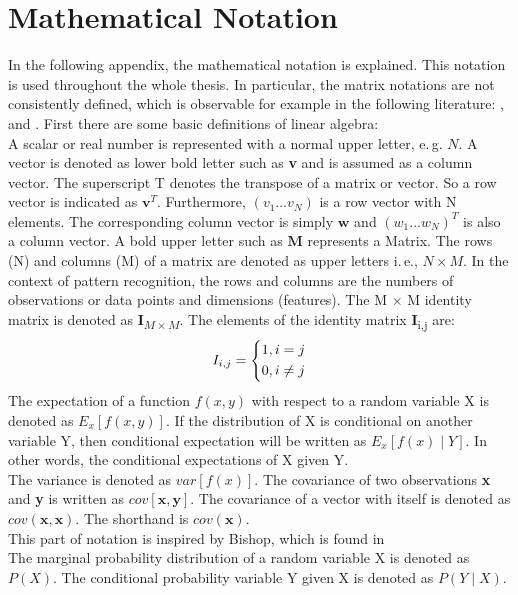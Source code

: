 \chapter{Mathematical Notation}\label{appaA}
In the following appendix, the mathematical notation is explained.
This notation is used throughout the whole thesis.
In particular, the matrix notations are not consistently defined, which is observable for example in the following literature: \cite{Chen.2009}, \cite{Bishop.2009} and \cite{Long.2015}.
First there are some basic definitions of linear algebra:\\
A scalar or real number is represented with a normal upper letter, e.\,g. $N$.
A vector is denoted as lower bold letter such as \textbf{v} and is assumed as a column vector.
The superscript T denotes the transpose of a matrix or vector. So a row vector is indicated as $\mathbf{v}^{T}$.
Furthermore, $(v_1 \dots v_N)$ is a row vector with N elements.
The corresponding column vector is simply $\mathbf{w}$ and $(w_1 \dots w_N)^T$ is also a column vector.
A bold upper letter such as $\mathbf{M}$ represents a Matrix.
The rows (N) and columns (M) of a matrix are denoted as upper letters i.\,e., $N \times M$. 
In the context of pattern recognition, the rows and columns are the numbers of observations or data points and dimensions (features). 
The M $\times$ M identity matrix is denoted as \textbf{I}\textsubscript{$M\times M$}.
The elements of the identity matrix \textbf{I}\textsubscript{i,j} are:
\[
I_{i,j}= \begin{dcases*}
1, i = j\\
0, i \neq j
\end{dcases*}
\]
The expectation of a function $f(x,y)$ with respect to a random variable X is denoted as $E_x[f(x,y)]$.
If the distribution of X is conditional on another variable Y, then conditional expectation will be written as $E_x[f(x)\mid Y]$. In other words, the conditional expectations of X given Y.\\
The variance is denoted as $var[f(x)]$.
The covariance of two observations \textbf{x} and \textbf{y} is written as $cov[\textbf{x},\textbf{y}]$.
The covariance of a vector with itself is denoted as $cov(\textbf{x},\textbf{x})$. The shorthand is $cov(\textbf{x})$.\\
This part of notation is inspired by Bishop, which is found in \cite[p. xi - xii]{Bishop.2009}\\
The marginal probability distribution of a random variable X is denoted as $P(X)$.
The conditional probability variable Y given X is denoted as $P(Y \mid X)$.

